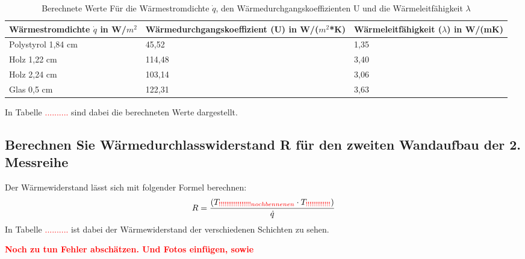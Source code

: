 \begin{table}[!ht]
    \centering
\caption{Berechnete Werte Für die Wärmestromdichte $\dot q$, den Wärmedurchgangskoeffizienten U und die Wärmeleitfähigkeit  $\lambda$ }
\label{tab:230524_Messdaten_Messreihe1(1)}
    \begin{tabular}{|l|l|l|}
    \hline
        Wärmestromdichte $\dot q$ in W/$m^2$ & Wärmedurchgangskoeffizient (U) in W/($m^2$*K) & Wärmeleitfähigkeit ($\lambda$) in W/(mK) \\ \hline
        Polystyrol 1,84 cm & 45,52 & 1,35 \\ \hline
        Holz 1,22 cm & 114,48 & 3,40 \\ \hline
        Holz 2,24 cm & 103,14 & 3,06 \\ \hline
        Glas 0,5 cm & 122,31 & 3,63 \\ \hline
    \end{tabular}
\end{table}
In Tabelle \textcolor{red}{..........}  sind dabei die berechneten Werte dargestellt.
%
%
% 
%
%
\subsection{Berechnen Sie Wärmedurchlasswiderstand R für den zweiten Wandaufbau der 2. Messreihe}
Der Wärmewiderstand lässt sich mit folgender Formel berechnen:
%
\begin{equation}
R=\frac{(T_{\textcolor{red}{!!!!!!!!!!!!!!!!! noch bennenen }} \cdot T_{\textcolor{red}{!!!!!!!!!!!!!}} )}{\dot q}
  \label{eq:230522_Wärmewiderstand}
\end{equation}
%
In Tabelle \textcolor{red}{..........}  ist dabei der Wärmewiderstand der verschiedenen Schichten zu sehen.

\textcolor{red}{\textbf{Noch zu tun Fehler abschätzen. Und Fotos einfügen, sowie  }}